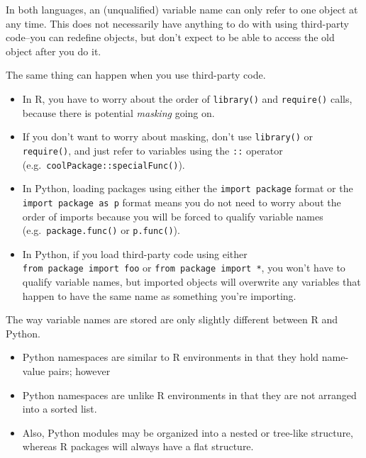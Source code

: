 \documentclass[
  12pt,
  krantz2]{krantz}
\providecommand{\tightlist}{%
  \setlength{\itemsep}{0pt}\setlength{\parskip}{0pt}}
\newenvironment{rmd-details}{\begin{lrbox}{\rmdbox}
  \minipage[c]{\dimexpr \textwidth-2\fboxrule-\wd\bulb-\columnsep}
    \vspace*{\columnsep}}%
{\vspace*{\columnsep}\endminipage\end{lrbox}%
  {\par\color{green}\fboxsep=0pt
    \fbox{\usebox\bulb\usebox\rmdbox\hspace{\columnsep}}\par}}
\begin{document}
\begin{rmd-details}

In both languages, an (unqualified) variable name can only refer to one object at any time. This does not necessarily have anything to do with using third-party code--you can redefine objects, but don't expect to be able to access the old object after you do it.

The same thing can happen when you use third-party code.

\begin{itemize}
\tightlist
\item
  In R, you have to worry about the order of \texttt{library()} and \texttt{require()} calls, because there is potential \emph{masking} going on.
\item
  If you don't want to worry about masking, don't use \texttt{library()} or \texttt{require()}, and just refer to variables using the \texttt{::} operator (e.g.~\texttt{coolPackage::specialFunc()}).
\item
  In Python, loading packages using either the \texttt{import\ package} format or the \texttt{import\ package\ as\ p} format means you do not need to worry about the order of imports because you will be forced to qualify variable names (e.g.~\texttt{package.func()} or \texttt{p.func()}).
\item
  In Python, if you load third-party code using either \texttt{from\ package\ import\ foo} or \texttt{from\ package\ import\ *}, you won't have to qualify variable names, but imported objects will overwrite any variables that happen to have the same name as something you're importing.
\end{itemize}

The way variable names are stored are only slightly different between R and Python.

\begin{itemize}
\tightlist
\item
  Python namespaces are similar to R environments in that they hold name-value pairs; however
\item
  Python namespaces are unlike R environments in that they are not arranged into a sorted list.
\item
  Also, Python modules may be organized into a nested or tree-like structure, whereas R packages will always have a flat structure.
\end{itemize}

\end{rmd-details}
\end{document}
